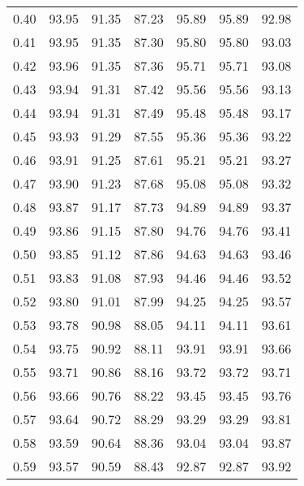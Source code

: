 \begin{tabular}{|c|c|c|c|c|c|c|}
      0.40 &     93.95 &     91.35 &      87.23 &   95.89 &      95.89 &         92.98 \\
      0.41 &     93.95 &     91.35 &      87.30 &   95.80 &      95.80 &         93.03 \\
      0.42 &     93.96 &     91.35 &      87.36 &   95.71 &      95.71 &         93.08 \\
      0.43 &     93.94 &     91.31 &      87.42 &   95.56 &      95.56 &         93.13 \\
      0.44 &     93.94 &     91.31 &      87.49 &   95.48 &      95.48 &         93.17 \\
      0.45 &     93.93 &     91.29 &      87.55 &   95.36 &      95.36 &         93.22 \\
      0.46 &     93.91 &     91.25 &      87.61 &   95.21 &      95.21 &         93.27 \\
      0.47 &     93.90 &     91.23 &      87.68 &   95.08 &      95.08 &         93.32 \\
      0.48 &     93.87 &     91.17 &      87.73 &   94.89 &      94.89 &         93.37 \\
      0.49 &     93.86 &     91.15 &      87.80 &   94.76 &      94.76 &         93.41 \\
      0.50 &     93.85 &     91.12 &      87.86 &   94.63 &      94.63 &         93.46 \\
      0.51 &     93.83 &     91.08 &      87.93 &   94.46 &      94.46 &         93.52 \\
      0.52 &     93.80 &     91.01 &      87.99 &   94.25 &      94.25 &         93.57 \\
      0.53 &     93.78 &     90.98 &      88.05 &   94.11 &      94.11 &         93.61 \\
      0.54 &     93.75 &     90.92 &      88.11 &   93.91 &      93.91 &         93.66 \\
      0.55 &     93.71 &     90.86 &      88.16 &   93.72 &      93.72 &         93.71 \\
      0.56 &     93.66 &     90.76 &      88.22 &   93.45 &      93.45 &         93.76 \\
      0.57 &     93.64 &     90.72 &      88.29 &   93.29 &      93.29 &         93.81 \\
      0.58 &     93.59 &     90.64 &      88.36 &   93.04 &      93.04 &         93.87 \\
      0.59 &     93.57 &     90.59 &      88.43 &   92.87 &      92.87 &         93.92 \\

\end{tabular}
